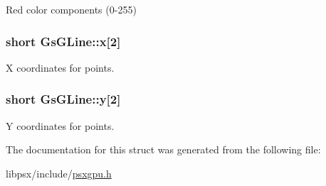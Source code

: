 Red color components (0-\/255) 

\hypertarget{structGsGLine_ad2b2ca6e5b8118612fde4c7053c0d840}{}
\subsubsection[{x}]{\setlength{\rightskip}{0pt plus 5cm}short Gs\+G\+Line\+::x\mbox{[}2\mbox{]}}\label{structGsGLine_ad2b2ca6e5b8118612fde4c7053c0d840}


X coordinates for points. 

\hypertarget{structGsGLine_a8717aff2a54e9e287094af8717eb1dff}{}
\subsubsection[{y}]{\setlength{\rightskip}{0pt plus 5cm}short Gs\+G\+Line\+::y\mbox{[}2\mbox{]}}\label{structGsGLine_a8717aff2a54e9e287094af8717eb1dff}


Y coordinates for points. 



The documentation for this struct was generated from the following file\+:\begin{DoxyCompactItemize}
\item 
libpsx/include/\hyperlink{psxgpu_8h}{psxgpu.\+h}\end{DoxyCompactItemize}
